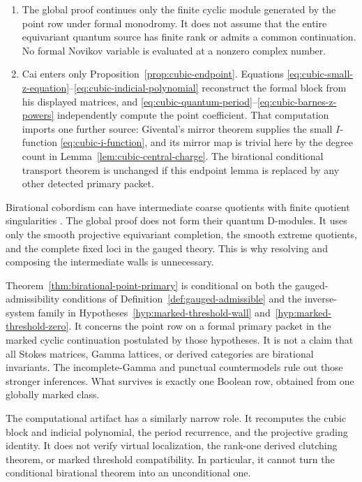 \begin{enumerate}[label=\textup{(\arabic*)}]
  unproved.  It is new to this manuscript and unproved.  Aleshkin--Liu prove a balanced contour
  theorem for finite-dimensional linear abelian GLSMs; they prove neither
  this marked compatibility nor its nonlinear virtual fixed-graph analogue.
  Remark~\ref{rem:two-tail-threshold-obstruction} shows that
  separate \((D)\)-finiteness does not determine the threshold maps.
\item The global proof continues only the finite cyclic module generated by
  the point row under formal monodromy.  It does not assume that the entire
  equivariant quantum source has finite rank or admits a common continuation.
  No formal Novikov variable is evaluated at a nonzero complex number.
\item Cai enters only Proposition~\ref{prop:cubic-endpoint}.  Equations
  \eqref{eq:cubic-small-z-equation}--\eqref{eq:cubic-indicial-polynomial}
  reconstruct the formal block from his displayed matrices, and
  \eqref{eq:cubic-quantum-period}--\eqref{eq:cubic-barnes-z-powers}
  independently compute the point coefficient.  That computation imports one
  further source: Givental's mirror theorem supplies the small
  \(I\)-function \eqref{eq:cubic-i-function}, and its mirror map is trivial
  here by the degree count in Lemma~\ref{lem:cubic-central-charge}.  The birational
  conditional transport theorem is unchanged if this endpoint lemma is
  replaced by any other detected primary packet.
\end{enumerate}

Birational cobordism can have intermediate coarse quotients with finite
quotient singularities \cite{Wlodarczyk,AKMW}.  The global proof does not form
their quantum D-modules.  It uses only the smooth projective equivariant
completion, the smooth extreme quotients, and the complete fixed loci in the
gauged theory.  This is why resolving and composing the intermediate walls is
unnecessary.

Theorem~\ref{thm:birational-point-primary} is conditional on both the
gauged-admissibility conditions of Definition~\ref{def:gauged-admissible} and
the inverse-system family in Hypotheses~\ref{hyp:marked-threshold-wall}
and~\ref{hyp:marked-threshold-zero}.  It
concerns the point row on a formal primary packet in the marked cyclic
continuation postulated by those hypotheses.
It is not a claim that all Stokes matrices, Gamma lattices, or derived
categories are birational invariants.  The incomplete-Gamma and punctual
countermodels rule out those stronger inferences.  What survives is exactly
one Boolean row, obtained from one globally marked class.

The computational artifact has a similarly narrow role.  It recomputes the
cubic block and indicial polynomial, the period recurrence, and the
projective grading identity.  It does not verify virtual localization,
the rank-one derived clutching theorem, or marked threshold compatibility.  In
particular, it cannot turn the
conditional birational theorem into an unconditional one.

